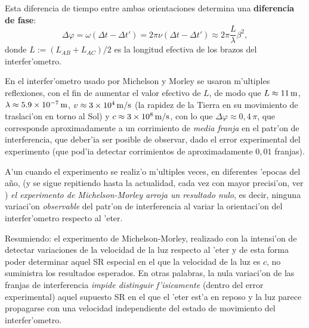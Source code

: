 Esta diferencia de tiempo entre ambas orientaciones determina una \textbf{diferencia de fase}:
\begin{equation}
\Delta\varphi=\omega(\Delta t-\Delta t')=2\pi\nu(\Delta t-\Delta t')\approx2\pi\frac{L}{\lambda} \beta^2,
\end{equation}
donde $L:=(L_{AB}+L_{AC})/2$ es la longitud efectiva de los brazos del interfer'ometro.

En el interfer'ometro usado por Michelson y Morley se usaron m'ultiples reflexiones, con el fin de aumentar el valor efectivo de $L$, de modo que $L\approx 11\,\rm m$, $\lambda\approx 5.9\times 10^{-7}\,\rm m$, $v\approx 3\times 10^4\,\rm m/s$ (la rapidez de la Tierra en su movimiento de traslaci'on en torno al Sol) y $c \approx 3\times 10^{8}\,\rm m/s$, con lo que $\Delta\varphi \approx 0,4\,\pi$, que corresponde aproximadamente a un corrimiento de \textit{media franja} en el patr'on de interferencia, que deber'ia ser posible de observar, dado el error experimental del experimento (que pod'ia detectar corrimientos de aproximadamente $0,01$ franjas).

A'un cuando el experimento se realiz'o m'ultiples veces, en diferentes 'epocas del a\~no, (y se sigue repitiendo hasta la actualidad, cada vez con mayor precisi'on, ver \cite{MHBSP03}) \textit{el experimento de Michelson-Morley arroja un resultado nulo}, es decir, ninguna variaci'on \textit{observable} del patr'on de interferencia al variar la orientaci'on del interfer'ometro respecto al 'eter.

Resumiendo: el experimento de Michelson-Morley, realizado con la intensi'on de detectar variaciones de la velocidad de la luz respecto al 'eter y de esta forma poder determinar aquel SR especial en el que la velocidad de la luz es $c$, no suministra los resultados esperados. En otras palabras, la nula variaci'on de las franjas de interferencia \textit{impide distinguir f'isicamente }(dentro del error experimental) aquel supuesto SR en el que el 'eter est'a en reposo y la luz parece propagarse con una velocidad independiente del estado de movimiento del interfer'ometro.

